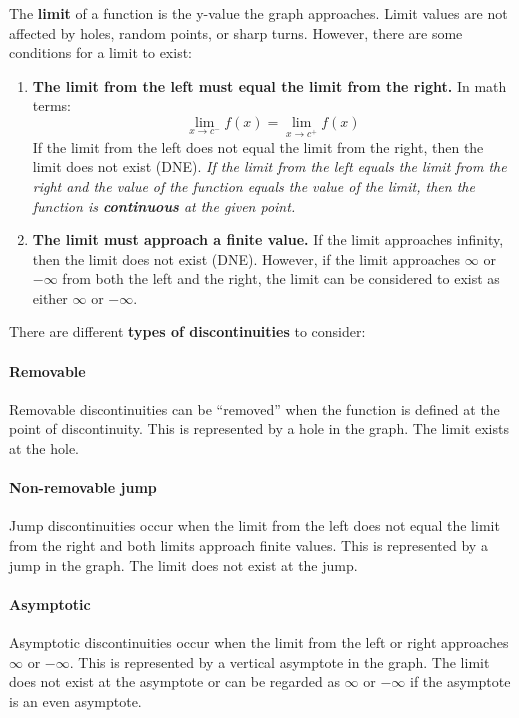\documentclass[letterpaper, 12pt]{article}
\begin{document}
The \textbf{limit} of a function is the y-value the graph approaches. Limit values are not affected by holes, random points, or sharp turns. However, there are some conditions for a limit to exist:

\begin{enumerate}
\item \textbf{The limit from the left must equal the limit from the right.} In math terms:
\[\lim_{x \to c^-} f(x) = \lim_{x \to c^+} f(x)\]
If the limit from the left does not equal the limit from the right, then the limit does not exist (DNE). \textit{If the limit from the left equals the limit from the right and the value of the function equals the value of the limit, then the function is \textbf{continuous} at the given point.}
\item \textbf{The limit must approach a finite value.} If the limit approaches infinity, then the limit does not exist (DNE). However, if the limit approaches $\infty$ or $-\infty$ from both the left and the right, the limit can be considered to exist as either $\infty$ or $-\infty$.
\end{enumerate}

There are different \textbf{types of discontinuities} to consider:

\paragraph{Removable} Removable discontinuities can be ``removed'' when the function is defined at the point of discontinuity. This is represented by a hole in the graph. The limit exists at the hole.

\paragraph{Non-removable jump} Jump discontinuities occur when the limit from the left does not equal the limit from the right and both limits approach finite values. This is represented by a jump in the graph. The limit does not exist at the jump.

\paragraph{Asymptotic} Asymptotic discontinuities occur when the limit from the left or right approaches $\infty$ or $-\infty$. This is represented by a vertical asymptote in the graph. The limit does not exist at the asymptote or can be regarded as $\infty$ or $-\infty$ if the asymptote is an even asymptote.
\end{document}
